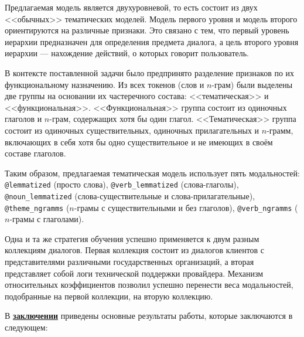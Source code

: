Предлагаемая модель является двухуровневой, то есть состоит из двух <<обычных>> тематических моделей. Модель первого уровня и модель второго ориентируются на различные признаки. Это связано с тем, что первый уровень иерархии предназначен для определения предмета диалога, а цель второго уровня иерархии --- нахождение действий, о которых говорит пользователь. %

В контексте поставленной задачи было предпринято разделение признаков по их функциональному назначению. Из всех токенов (слов и $n$-грам) были выделены две группы на основании их частеречного состава: <<тематическая>> и <<функциональная>>. <<Функциональная>> группа состоит из одиночных глаголов и $n$-грам, содержащих хотя бы один глагол. <<Тематическая>> группа состоит из одиночных существительных, одиночных прилагательных и $n$-грамм, включающих в себя хотя бы одно существительное и не имеющих в своём составе глаголов.

Таким образом, предлагаемая тематическая модель использует пять модальностей: \texttt{@lemmatized} (просто слова), \texttt{@verb\_lemmatized} (слова-глаголы), \texttt{@noun\_lemmatized} (слова-существительные и слова-прилагательные), \texttt{@theme\_ngramms} ($n$-грамы с существительными и без глаголов), \texttt{@verb\_ngramms} ($n$-грамы с глаголами).

Одна и та же стратегия обучения успешно применяется к двум разным коллекциям диалогов. Первая коллекция состоит из диалогов клиентов с представителями различными государственных организаций, а вторая представляет собой логи технической поддержки провайдера. Механизм относительных коэффициентов позволил успешно перенести веса модальностей, подобранные на первой коллекции, на вторую коллекцию.

\FloatBarrier
{}                                  %
В \underline{\textbf{заключении}} приведены основные результаты работы, которые заключаются в следующем:




